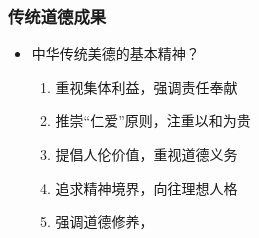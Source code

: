 \hypertarget{ux4f20ux7edfux9053ux5fb7ux6210ux679c}{%
\subsubsection{传统道德成果}\label{ux4f20ux7edfux9053ux5fb7ux6210ux679c}}

\begin{itemize}
\tightlist
\item
  中华传统美德的基本精神？

  \begin{enumerate}
  \def\labelenumi{\arabic{enumi}.}
  \tightlist
  \item
    重视集体利益，强调责任奉献
  \item
    推崇``仁爱''原则，注重以和为贵
  \item
    提倡人伦价值，重视道德义务
  \item
    追求精神境界，向往理想人格
  \item
    强调道德修养，
  \end{enumerate}
\end{itemize}
